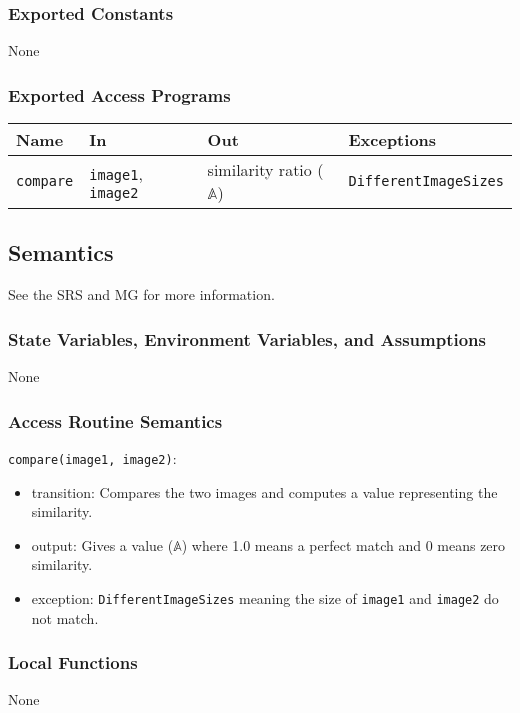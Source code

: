 \documentclass[12pt, titlepage]{article}
\newcommand{\code}[1]{\texttt{#1}}
\begin{document}
\subsubsection{Exported Constants}
None

\subsubsection{Exported Access Programs}

\begin{center}
\begin{tabular}{p{2cm} p{4cm} p{4cm} p{5cm}}
\hline
\textbf{Name} & \textbf{In} & \textbf{Out} & \textbf{Exceptions} \\
\hline
\code{compare} & \code{image1}, \code{image2} & similarity ratio ($\mathbb{A}$) & \code{DifferentImageSizes} \\
\hline
\end{tabular}
\end{center}

\subsection{Semantics}
See the SRS \cite{SRS} and MG \cite{MG} for more information.

\subsubsection{State Variables, Environment Variables, and Assumptions}
None

\subsubsection{Access Routine Semantics}

\noindent \code{compare(image1, image2)}:
\begin{itemize}
\item transition: Compares the two images and computes a value representing the similarity.
\item output: Gives a value ($\mathbb{A}$) where 1.0 means a perfect match and 0 means zero similarity.
\item exception: \code{DifferentImageSizes} meaning the size of \code{image1} and
  \code{image2} do not match.
\end{itemize}

\subsubsection{Local Functions}
None
\end{document}
